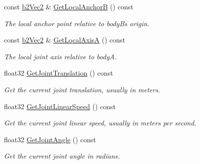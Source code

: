 \begin{DoxyCompactItemize}
\mbox{\label{classb2WheelJoint_a78c56833f42bfc61998aa5ea8c876f3e}} 
const \hyperlink{structb2Vec2}{b2\+Vec2} \& \hyperlink{classb2WheelJoint_a78c56833f42bfc61998aa5ea8c876f3e}{Get\+Local\+AnchorB} () const
\begin{DoxyCompactList}\small\item\em The local anchor point relative to bodyB\textquotesingle{}s origin. \end{DoxyCompactList}\item 
\mbox{\label{classb2WheelJoint_a86bf4dbf356f9095c05d62313810e602}} 
const \hyperlink{structb2Vec2}{b2\+Vec2} \& \hyperlink{classb2WheelJoint_a86bf4dbf356f9095c05d62313810e602}{Get\+Local\+AxisA} () const
\begin{DoxyCompactList}\small\item\em The local joint axis relative to bodyA. \end{DoxyCompactList}\item 
\mbox{\label{classb2WheelJoint_a4cebb70f659344d5d93c1885d47000e3}} 
float32 \hyperlink{classb2WheelJoint_a4cebb70f659344d5d93c1885d47000e3}{Get\+Joint\+Translation} () const
\begin{DoxyCompactList}\small\item\em Get the current joint translation, usually in meters. \end{DoxyCompactList}\item 
\mbox{\label{classb2WheelJoint_a3cbdc95c55c9bf5b9f2b46b05fc2a5e5}} 
float32 \hyperlink{classb2WheelJoint_a3cbdc95c55c9bf5b9f2b46b05fc2a5e5}{Get\+Joint\+Linear\+Speed} () const
\begin{DoxyCompactList}\small\item\em Get the current joint linear speed, usually in meters per second. \end{DoxyCompactList}\item 
\mbox{\label{classb2WheelJoint_a3ea115dde9bad34d23fd59068734824a}} 
float32 \hyperlink{classb2WheelJoint_a3ea115dde9bad34d23fd59068734824a}{Get\+Joint\+Angle} () const
\begin{DoxyCompactList}\small\item\em Get the current joint angle in radians. \end{DoxyCompactList}\item 

\end{DoxyCompactItemize}
